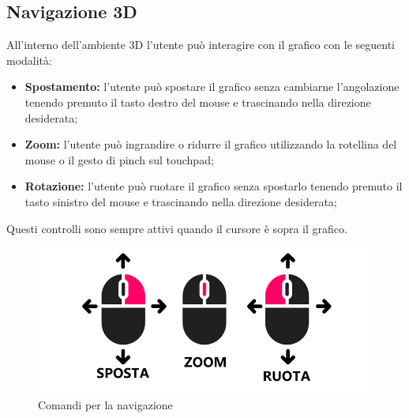 \subsection{Navigazione 3D}
All'interno dell'ambiente 3D l'utente può interagire con il grafico con le
seguenti modalità:
\begin{itemize}
    \item \textbf{Spostamento:} l'utente può spostare il grafico senza cambiarne
          l'angolazione tenendo premuto il tasto destro del mouse e trascinando
          nella direzione desiderata;
    \item \textbf{Zoom:} l'utente può ingrandire o ridurre il grafico
          utilizzando la rotellina del mouse o il gesto di pinch sul touchpad;
    \item \textbf{Rotazione:} l'utente può ruotare il grafico senza spostarlo
          tenendo premuto il tasto sinistro del mouse e trascinando nella direzione desiderata;
\end{itemize}
Questi controlli sono sempre attivi quando il cursore è sopra il grafico.
\begin{figure}[ht!]
    \centering
    \includegraphics[scale=0.6]{template/images/comandi.png}
    \caption{Comandi per la navigazione}
\end{figure}

